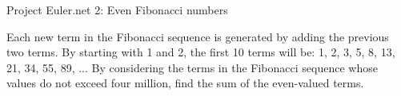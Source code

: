 Project Euler.net 2: Even Fibonacci numbers

Each new term in the Fibonacci sequence is generated by adding the previous two terms. By starting with 1 and 2, the first 10 terms will be: 1, 2, 3, 5, 8, 13, 21, 34, 55, 89, ... By considering the terms in the Fibonacci sequence whose values do not exceed four million, find the sum of the even-valued terms.
